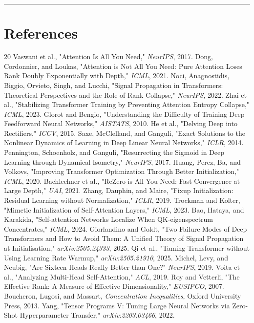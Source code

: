 \documentclass[11pt,letterpaper]{article}
\theoremstyle{definition}
\begin{document}
\vspace{0.35em}\hrule\vspace{0.35em}
\section{References}
\begin{thebibliography}{20}
 Vaswani et al., "Attention Is All You Need," \textit{NeurIPS}, 2017.
 Dong, Cordonnier, and Loukas, "Attention is Not All You Need: Pure Attention Loses Rank Doubly Exponentially with Depth," \textit{ICML}, 2021.
 Noci, Anagnostidis, Biggio, Orvieto, Singh, and Lucchi, "Signal Propagation in Transformers: Theoretical Perspectives and the Role of Rank Collapse," \textit{NeurIPS}, 2022.
 Zhai et al., "Stabilizing Transformer Training by Preventing Attention Entropy Collapse," \textit{ICML}, 2023.
 Glorot and Bengio, "Understanding the Difficulty of Training Deep Feedforward Neural Networks," \textit{AISTATS}, 2010.
 He et al., "Delving Deep into Rectifiers," \textit{ICCV}, 2015.
 Saxe, McClelland, and Ganguli, "Exact Solutions to the Nonlinear Dynamics of Learning in Deep Linear Neural Networks," \textit{ICLR}, 2014.
 Pennington, Schoenholz, and Ganguli, "Resurrecting the Sigmoid in Deep Learning through Dynamical Isometry," \textit{NeurIPS}, 2017.
 Huang, Perez, Ba, and Volkovs, "Improving Transformer Optimization Through Better Initialization," \textit{ICML}, 2020.
 Bachlechner et al., "ReZero is All You Need: Fast Convergence at Large Depth," \textit{UAI}, 2021.
 Zhang, Dauphin, and Maire, "Fixup Initialization: Residual Learning without Normalization," \textit{ICLR}, 2019.
 Trockman and Kolter, "Mimetic Initialization of Self-Attention Layers," \textit{ICML}, 2023.
 Bao, Hataya, and Karakida, "Self-attention Networks Localize When QK-eigenspectrum Concentrates," \textit{ICML}, 2024.
 Giorlandino and Goldt, "Two Failure Modes of Deep Transformers and How to Avoid Them: A Unified Theory of Signal Propagation at Initialisation," \textit{arXiv:2505.24333}, 2025.
 Qi et al., "Taming Transformer without Using Learning Rate Warmup," \textit{arXiv:2505.21910}, 2025.
 Michel, Levy, and Neubig, "Are Sixteen Heads Really Better than One?" \textit{NeurIPS}, 2019.
 Voita et al., "Analyzing Multi-Head Self-Attention," \textit{ACL}, 2019.
 Roy and Vetterli, "The Effective Rank: A Measure of Effective Dimensionality," \textit{EUSIPCO}, 2007.
 Boucheron, Lugosi, and Massart, \textit{Concentration Inequalities}, Oxford University Press, 2013.
 Yang, "Tensor Programs V: Tuning Large Neural Networks via Zero-Shot Hyperparameter Transfer," \textit{arXiv:2203.03466}, 2022.
\end{thebibliography}
\end{document}
